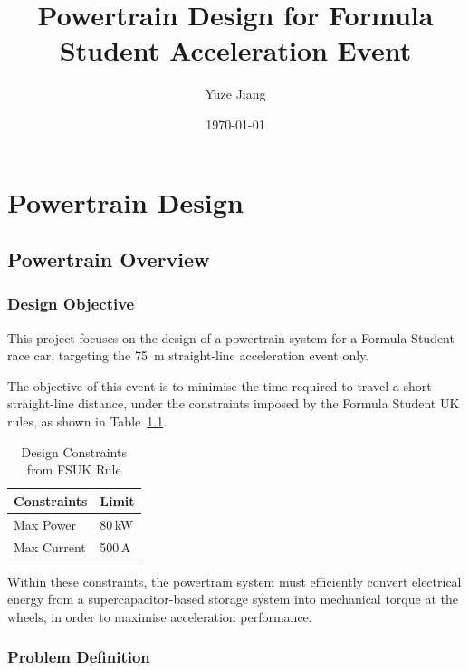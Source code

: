 \documentclass[11pt, a4paper]{report}
\title{Powertrain Design for Formula Student Acceleration Event}
\author{Yuze Jiang}
\date{\today}
\numberwithin{equation}{section}
\begin{document}

\maketitle

\newpage

\setcounter{page}{1}

\tableofcontents
\newpage

\chapter{Powertrain Design}

\section{Powertrain Overview}

\subsection{Design Objective}

This project focuses on the design of a powertrain system for a Formula Student race car, targeting the \SI{75}{\meter} straight-line acceleration event only.

The objective of this event is to minimise the time required to travel a short straight-line distance, under the constraints imposed by the Formula Student UK rules, as shown in Table~\ref{tab:FSUK_constraints}.

\begin{table}[H]
\centering
\small

\caption{Design Constraints from FSUK Rule\cite{fs-ev-rules2026}}
\label{tab:FSUK_constraints}

\begin{tabular}{ll}
\toprule
\textbf{Constraints} & \textbf{Limit} \\
\midrule
Max Power & 80\,kW \\
Max Current & 500\,A \\
\bottomrule
\end{tabular}
\end{table}

Within these constraints, the powertrain system must efficiently convert electrical energy from a supercapacitor-based storage system into mechanical torque at the wheels, in order to maximise acceleration performance.

\subsection{Problem Definition}
\end{document}
